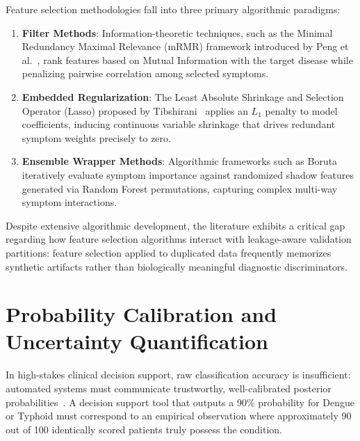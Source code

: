 Feature selection methodologies fall into three primary algorithmic paradigms:
\begin{enumerate}
    \item \textbf{Filter Methods}: Information-theoretic techniques, such as the Minimal Redundancy Maximal Relevance (mRMR) framework introduced by Peng et al.~\cite{peng2005feature}, rank features based on Mutual Information with the target disease while penalizing pairwise correlation among selected symptoms.
    \item \textbf{Embedded Regularization}: The Least Absolute Shrinkage and Selection Operator (Lasso) proposed by Tibshirani~\cite{tibshirani1996regression} applies an $L_1$ penalty to model coefficients, inducing continuous variable shrinkage that drives redundant symptom weights precisely to zero.
    \item \textbf{Ensemble Wrapper Methods}: Algorithmic frameworks such as Boruta~\cite{kursa2010feature} iteratively evaluate symptom importance against randomized shadow features generated via Random Forest permutations, capturing complex multi-way symptom interactions.
\end{enumerate}

Despite extensive algorithmic development, the literature exhibits a critical gap regarding how feature selection algorithms interact with leakage-aware validation partitions: feature selection applied to duplicated data frequently memorizes synthetic artifacts rather than biologically meaningful diagnostic discriminators.

\section{Probability Calibration and Uncertainty Quantification}
\label{sec:calibration_lit}

In high-stakes clinical decision support, raw classification accuracy is insufficient: automated systems must communicate trustworthy, well-calibrated posterior probabilities~\cite{shortliffe2018clinical}. A decision support tool that outputs a 90\% probability for Dengue or Typhoid must correspond to an empirical observation where approximately 90 out of 100 identically scored patients truly possess the condition.

